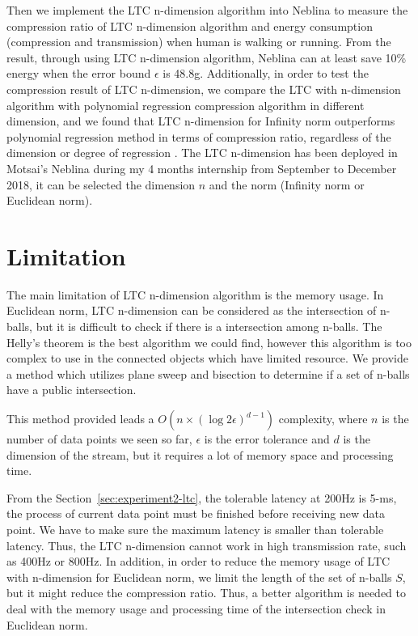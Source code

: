 Then we implement the LTC n-dimension algorithm into Neblina to measure the
compression ratio of LTC n-dimension algorithm and energy consumption
(compression and transmission) when human is walking or running. From the
result, through using LTC n-dimension algorithm, Neblina can at least save 10\%
energy when the error bound $\epsilon$ is 48.8g. Additionally, in order to test
the compression result of LTC n-dimension, we compare the LTC with n-dimension
algorithm with polynomial regression compression algorithm in different
dimension, and we found that LTC n-dimension for Infinity norm outperforms
polynomial regression method in terms of compression ratio, regardless of the
dimension or degree of regression . The LTC n-dimension has been deployed in Motsai's Neblina during my 4
months internship from September to December 2018, it can be selected the
dimension $n$ and the norm (Infinity norm or Euclidean norm).

\section{Limitation}


The main limitation of LTC n-dimension algorithm is the memory usage. In
Euclidean norm, LTC n-dimension can be considered as the intersection of
n-balls, but it is difficult to check if there is a intersection among n-balls.
The Helly's theorem is the best algorithm we could find, however this algorithm
is too complex to use in the connected objects which have limited resource.  We
provide a method which utilizes plane sweep and bisection to determine if a set
of n-balls have a public intersection.

This method provided leads a $O(n\times (\log{2\epsilon})^{d-1})$ complexity,
where $n$ is the number of data points we seen so far, $\epsilon$ is the error
tolerance and $d$ is the dimension of the stream, but it requires a lot of
memory space and processing time. 

From the Section~\ref{sec:experiment2-ltc}, the tolerable latency at 200Hz is
5-ms, the process of current data point must be finished before receiving new
data point. We have to make sure the maximum latency is smaller than tolerable
latency. Thus, the LTC n-dimension cannot work in high transmission rate, such
as 400Hz or 800Hz. In addition, in order to reduce the memory usage of LTC with
n-dimension for Euclidean norm, we limit the length of the set of n-balls $S$,
but it might reduce the compression ratio. Thus, a better algorithm is needed to
deal with the memory usage and processing time of the intersection check in
Euclidean norm.


